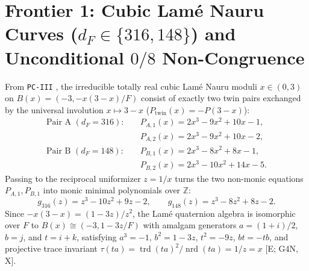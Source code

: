 \documentclass[11pt]{amsart}
\numberwithin{equation}{section}
\theoremstyle{plain}
\theoremstyle{definition}\newtheorem{definition}[theorem]{Definition}
\theoremstyle{remark}\newtheorem{remark}[theorem]{Remark}
\newcommand{\Z}{\mathbb{Z}}
\newcommand{\nrd}{\operatorname{nrd}}
\newcommand{\trd}{\operatorname{trd}}
\newcommand{\ctag}[1]{\textup{\textsf{\scriptsize[#1]}}}
\begin{document}
\section{Frontier 1: Cubic Lam\'e Nauru Curves (\texorpdfstring{$d_F \in \{316, 148\}$}{dF in {316, 148}}) and Unconditional \texorpdfstring{$0/8$}{0/8} Non-Congruence}\label{sec:frontier1}

From \texttt{PC-III} \cite{ergentics2026pc3}, the irreducible totally real cubic Lam\'e Nauru moduli $x \in (0,3)$ on $B(x) = (-3, -x(3-x)/F)$ consist of exactly two twin pairs exchanged by the universal involution $x \mapsto 3 - x$ ($P_{\mathrm{twin}}(x) = -P(3-x)$):
\begin{align}
\text{Pair A } (d_F = 316): &\quad P_{A,1}(x) = 2x^3 - 9x^2 + 10x - 1, \nonumber\\
                             &\quad P_{A,2}(x) = 2x^3 - 9x^2 + 10x - 2, \label{eq:cubic_pairA}\\
\text{Pair B } (d_F = 148): &\quad P_{B,1}(x) = 2x^3 - 8x^2 + 8x - 1, \nonumber\\
                             &\quad P_{B,2}(x) = 2x^3 - 10x^2 + 14x - 5. \label{eq:cubic_pairB}
\end{align}
Passing to the reciprocal uniformizer $z = 1/x$ turns the two non-monic equations $P_{A,1}, P_{B,1}$ into monic minimal polynomials over $\Z$:
\begin{equation}\label{eq:cubic_monic}
g_{316}(z) = z^3 - 10z^2 + 9z - 2, \qquad g_{148}(z) = z^3 - 8z^2 + 8z - 2.
\end{equation}
Since $-x(3-x) = (1-3z)/z^2$, the Lam\'e quaternion algebra is isomorphic over $F$ to $B(x) \cong (-3, 1-3z / F)$ with amalgam generators $a = (1+i)/2$, $b = j$, and $t = i + k$, satisfying $a^3 = -1$, $b^2 = 1-3z$, $t^2 = -9z$, $bt = -tb$, and projective trace invariant $\tau(ta) = \trd(ta)^2/\nrd(ta) = 1/z = x$ \ctag{E; G4N, X}.
\end{document}
